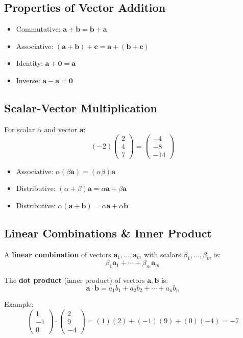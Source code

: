 \documentclass{book}
\begin{document}
\subsection{Properties of Vector Addition}
\begin{itemize}
    \item Commutative: $\bm{a} + \bm{b} = \bm{b} + \bm{a}$
    \item Associative: $(\bm{a} + \bm{b}) + \bm{c} = \bm{a} + (\bm{b} + \bm{c})$
    \item Identity: $\bm{a} + \bm{0} = \bm{a}$
    \item Inverse: $\bm{a} - \bm{a} = \bm{0}$
\end{itemize}

\subsection{Scalar-Vector Multiplication}
For scalar $\alpha$ and vector $\bm{a}$:
\[
    (-2) \begin{pmatrix} 2 \\ 4 \\ 7 \end{pmatrix} = 
    \begin{pmatrix} -4 \\ -8 \\ -14 \end{pmatrix}
\]

\begin{itemize}
    \item Associative: $\alpha(\beta\bm{a}) = (\alpha\beta)\bm{a}$
    \item Distributive: $(\alpha + \beta)\bm{a} = \alpha\bm{a} + \beta\bm{a}$
    \item Distributive: $\alpha(\bm{a} + \bm{b}) = \alpha\bm{a} + \alpha\bm{b}$
\end{itemize}

\subsection{Linear Combinations \& Inner Product}
A \textbf{linear combination} of vectors $\bm{a}_1, ..., \bm{a}_m$ with scalars $\beta_1, ..., \beta_m$ is:
\[
    \beta_1\bm{a}_1 + \cdots + \beta_m\bm{a}_m
\]

The \textbf{dot product} (inner product) of vectors $\bm{a}, \bm{b}$ is:
\[
    \bm{a} \cdot \bm{b} = a_1b_1 + a_2b_2 + \cdots + a_nb_n
\]

Example:
\[
    \begin{pmatrix} 1 \\ -1 \\ 0 \end{pmatrix} \cdot
    \begin{pmatrix} 2 \\ 9 \\ -4 \end{pmatrix} = 
    (1)(2) + (-1)(9) + (0)(-4) = -7
\]
\end{document}

